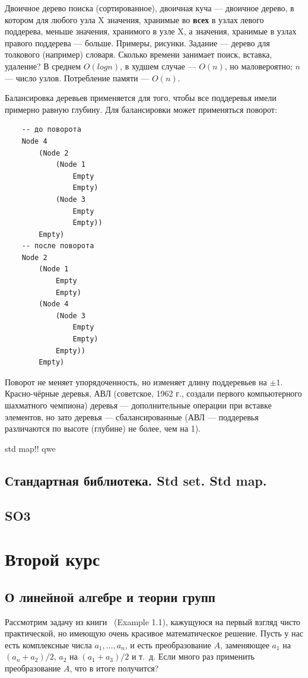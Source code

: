 \documentclass{book}
\begin{document}
Двоичное дерево поиска (сортированное), двоичная куча --- двоичное дерево, в котором для любого
узла X значения, хранимые во {\bf всех} в узлах левого поддерева, меньше значения, хранимого в узле
X, а значения, хранимые в узлах правого поддерева --- больше. Примеры, рисунки. Задание --- дерево
для толкового (например) словаря. Сколько времени занимает поиск, вставка, удаление? В среднем
$O(log n)$, в худшем случае --- $O(n)$, но маловероятно; $n$ --- число узлов. Потребление памяти
--- $O(n)$.

Балансировка деревьев применяется для того, чтобы все поддеревья имели примерно равную глубину. Для
балансировки может применяться поворот:
\begin{verbatim}
    -- до поворота
    Node 4
        (Node 2
            (Node 1
                Empty
                Empty)
            (Node 3
                Empty
                Empty))
        Empty)
    -- после поворота
    Node 2
        (Node 1
            Empty
            Empty)
        (Node 4
            (Node 3
                Empty
                Empty)
            Empty))
        Empty)
\end{verbatim}
Поворот не меняет упорядоченность, но изменяет длину поддеревьев на $\pm 1$. Красно-чёрные деревья,
АВЛ (советское, 1962 г., создали первого компьютерного шахматного чемпиона) деревья ---
дополнительные операции при вставке элементов, но зато деревья --- сбалансированные (АВЛ ---
поддеревья различаются по высоте (глубине) не более, чем на 1).

std map!! qwe

\subsection{Стандартная библиотека. Std set. Std map.}

\subsection{SO3}

\section{Второй курс}

\subsection{О линейной алгебре и теории групп}

Рассмотрим задачу из книги~\cite{Kirillov08} (Example 1.1), кажущуюся на первый взгляд чисто
практической, но имеющую очень красивое математическое решение. Пусть у нас есть комплексные числа $a_1, ...,
a_n$, и есть преобразование $A$, заменяющее $a_1$ на $(a_n + a_2) / 2$, $a_2$ на $(a_1 + a_3) /
2$ и т.~д. Если много раз применить преобразование $A$, что в итоге получится?
\end{document}
